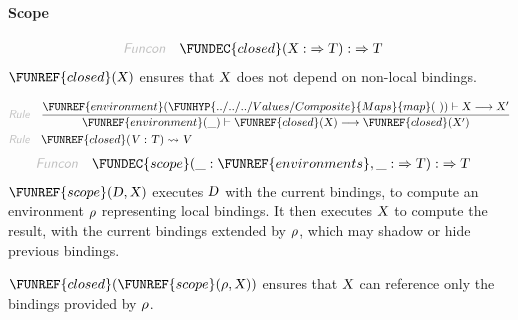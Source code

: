 \paragraph{Scope}\hypertarget{scope}{}\label{scope}

\begin{align*}
  \KEY{Funcon} \quad
  & \FUNDEC{closed}(
                       \VAR{X} :  \TO \VAR{T}) 
    :  \TO \VAR{T} 
\end{align*}
$\FUNREF{closed}
    (  \VAR{X} )$ ensures that $\VAR{X}$ does not depend on non-local bindings.

\begin{align*}
  \KEY{Rule} \quad
    & \frac{
      \FUNREF{environment} (  \FUNHYP{../../../Values/Composite}{Maps}{map}
                                   (   \  ) ) \vdash \VAR{X} \TRANS 
        \VAR{X}'
      }{
      \FUNREF{environment} (  \_ ) \vdash \FUNREF{closed}
                    (  \VAR{X} ) \TRANS 
        \FUNREF{closed}
          (  \VAR{X}' )
      }
\\
  \KEY{Rule} \quad
    & \FUNREF{closed}
        (  \VAR{V} : \VAR{T} ) \leadsto 
        \VAR{V}
\end{align*}
\begin{align*}
  \KEY{Funcon} \quad
  & \FUNDEC{scope}(
                       \_ : \FUNREF{environments}, \_ :  \TO \VAR{T}) 
    :  \TO \VAR{T} 
\end{align*}
$\FUNREF{scope}
    (  \VAR{D}, 
           \VAR{X} )$ executes $\VAR{D}$ with the current bindings, to compute an environment
  $\VAR{\ensuremath{\rho}}$ representing local bindings. It then executes $\VAR{X}$ to compute the result,
  with the current bindings extended by $\VAR{\ensuremath{\rho}}$, which may shadow or hide previous
  bindings.

$\FUNREF{closed}
    (  \FUNREF{scope}
            (  \VAR{\ensuremath{\rho}}, 
                   \VAR{X} ) )$ ensures that $\VAR{X}$ can reference only the bindings
  provided by $\VAR{\ensuremath{\rho}}$.

